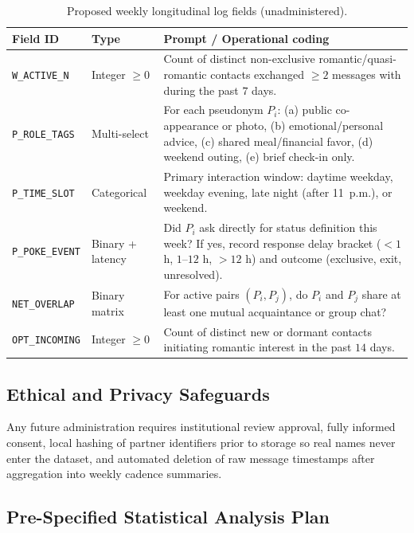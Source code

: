 \begin{table}[htbp]
\centering
\footnotesize
\caption{Proposed weekly longitudinal log fields (unadministered).}
\label{tab:instrument-fields}
\begin{tabularx}{\textwidth}{@{}llL@{}}
\toprule
Field ID & Type & Prompt / Operational coding \\
\midrule
\texttt{W\_ACTIVE\_N} & Integer $\ge 0$ & Count of distinct non-exclusive romantic/quasi-romantic contacts exchanged $\ge 2$ messages with during the past $7$ days. \\
\texttt{P\_ROLE\_TAGS} & Multi-select & For each pseudonym $P_i$: (a) public co-appearance or photo, (b) emotional/personal advice, (c) shared meal/financial favor, (d) weekend outing, (e) brief check-in only. \\
\texttt{P\_TIME\_SLOT} & Categorical & Primary interaction window: daytime weekday, weekday evening, late night (after 11~p.m.), or weekend. \\
\texttt{P\_POKE\_EVENT} & Binary + latency & Did $P_i$ ask directly for status definition this week? If yes, record response delay bracket ($<1$ h, $1$--$12$ h, $>12$ h) and outcome (exclusive, exit, unresolved). \\
\texttt{NET\_OVERLAP} & Binary matrix & For active pairs $(P_i, P_j)$, do $P_i$ and $P_j$ share at least one mutual acquaintance or group chat? \\
\texttt{OPT\_INCOMING} & Integer $\ge 0$ & Count of distinct new or dormant contacts initiating romantic interest in the past $14$ days. \\
\bottomrule
\end{tabularx}
\end{table}

\subsection{Ethical and Privacy Safeguards}
\label{app:inst-ethics}

Any future administration requires institutional review approval, fully informed
consent, local hashing of partner identifiers prior to storage so real names
never enter the dataset, and automated deletion of raw message timestamps after
aggregation into weekly cadence summaries.

\subsection{Pre-Specified Statistical Analysis Plan}
\label{app:inst-analysis}

